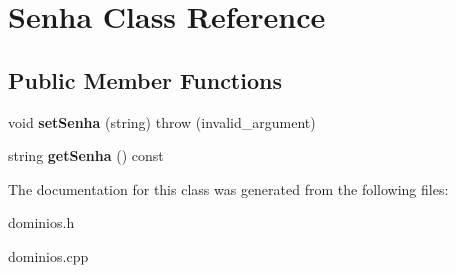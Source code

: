 \hypertarget{classSenha}{}\section{Senha Class Reference}
\label{classSenha}
\subsection*{Public Member Functions}
\begin{DoxyCompactItemize}
\item 
\mbox{\label{classSenha_a735e4bf5f65cc8d28daa7dbf202fd999}} 
void {\bfseries set\+Senha} (string)  throw (invalid\+\_\+argument)
\item 
\mbox{\label{classSenha_a1cc904431d0a8287d0b22dee3e9d34ae}} 
string {\bfseries get\+Senha} () const
\end{DoxyCompactItemize}


The documentation for this class was generated from the following files\+:\begin{DoxyCompactItemize}
\item 
dominios.\+h\item 
dominios.\+cpp\end{DoxyCompactItemize}
